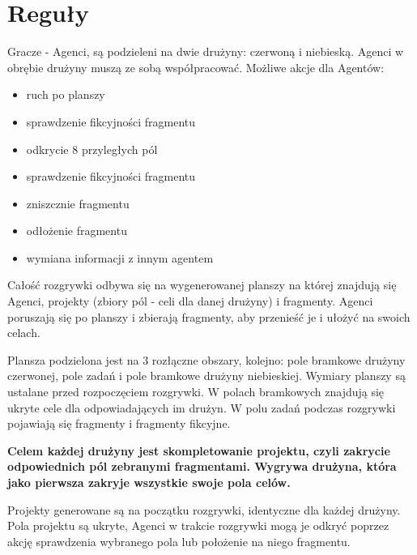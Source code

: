 \documentclass[Dokumentacja.tex]{subfiles}
\begin{document}
\section{Reguły}
Gracze - Agenci, są podzieleni na dwie drużyny: czerwoną i niebieską. Agenci w obrębie drużyny muszą ze sobą współpracować. Możliwe akcje dla Agentów:
\begin{itemize}
	\item ruch po planszy
	\item sprawdzenie fikcyjności fragmentu
	\item odkrycie 8 przyległych pól
	\item sprawdzenie fikcyjności fragmentu
	\item zniszcznie fragmentu
	\item odłożenie fragmentu
	\item wymiana informacji z innym agentem
\end{itemize}

Całość rozgrywki odbywa się na wygenerowanej planszy na której znajdują się Agenci, projekty (zbiory pól - celi dla danej drużyny) i fragmenty.  Agenci poruszają się po planszy i zbierają fragmenty, aby przenieść je i ułożyć na swoich celach.

Plansza podzielona jest na 3 rozłączne obszary, kolejno: pole bramkowe drużyny czerwonej, pole zadań i pole bramkowe drużyny niebieskiej. Wymiary planszy są ustalane przed rozpoczęciem rozgrywki. W polach bramkowych znajdują się ukryte cele dla odpowiadających im drużyn. W polu zadań podczas rozgrywki pojawiają się fragmenty i fragmenty fikcyjne.

\textbf{Celem każdej drużyny jest skompletowanie projektu, czyli zakrycie odpowiednich pól zebranymi fragmentami. Wygrywa drużyna, która jako pierwsza zakryje wszystkie swoje pola celów.}

Projekty generowane są na początku rozgrywki, identyczne dla każdej drużyny. Pola projektu są ukryte, Agenci w trakcie rozgrywki mogą je odkryć poprzez akcję sprawdzenia wybranego pola lub położenie na niego fragmentu.
\end{document}
